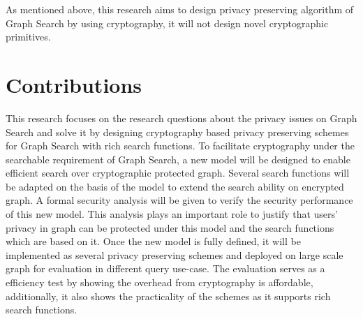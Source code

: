 As mentioned above, this research aims to design privacy preserving algorithm of Graph Search by using cryptography, it will not design novel cryptographic primitives. 

\section{Contributions}
This research focuses on the research questions about the privacy issues on Graph Search and solve it by designing cryptography based privacy preserving schemes for Graph Search with rich search functions. 
To facilitate cryptography under the searchable requirement of Graph Search, a new model will be designed to enable efficient search over cryptographic protected graph. Several search functions will be adapted on the basis of the model to extend the search ability on encrypted graph. 
A formal security analysis will be given to verify the security performance of this new model. This analysis plays an important role to justify that users' privacy in graph can be protected under this model and the search functions which are based on it. 
Once the new model is fully defined, it will be implemented as several privacy preserving schemes and deployed on large scale graph for evaluation in different query use-case. The evaluation serves as a efficiency test by showing the overhead from cryptography is affordable, additionally, it also shows the practicality of the schemes as it supports rich search functions.






